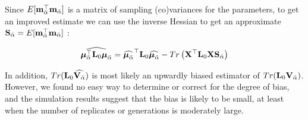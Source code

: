 \documentclass[12pt]{article}
\begin{document}
\begin{bibunit}
Since $E[{\bf m}_{\bar{\alpha}}^{\top}{\bf m}_{\bar{\alpha}}]$ is a matrix of sampling (co)variances for the parameters, to get an improved estimate we can use the inverse Hessian to get an approximate ${\bf S}_{\bar{\alpha}}=E[{\bf m}_{\bar{\alpha}}^{\top}{\bf m}_{\bar{\alpha}}]$ :

\begin{equation} 
\widehat{\boldsymbol{\mu}_{\bar{\alpha}}^{\top}{\bf L}_0\boldsymbol{\mu}_{\bar{\alpha}}}= \widehat{\boldsymbol{\mu}_{\bar{\alpha}}}^{\top}{\bf L}_0\widehat{\boldsymbol{\mu}_{\bar{\alpha}}}-Tr\left({\bf X}^{\top}{\bf L}_0{\bf X}{\bf S}_{\bar{\alpha}}\right)
\end{equation} 

In addition, $Tr({\bf L}_0\widehat{{\bf V}_{\bar \alpha}})$ is most likely an upwardly biased estimator of $Tr({\bf L}_0{\bf V}_{\bar \alpha})$. However, we found no easy way to determine or correct for the degree of bias, and the simulation results suggest that the bias is likely to be small, at least when the number of replicates or generations is moderately large.\\






\end{bibunit}
\end{document}
